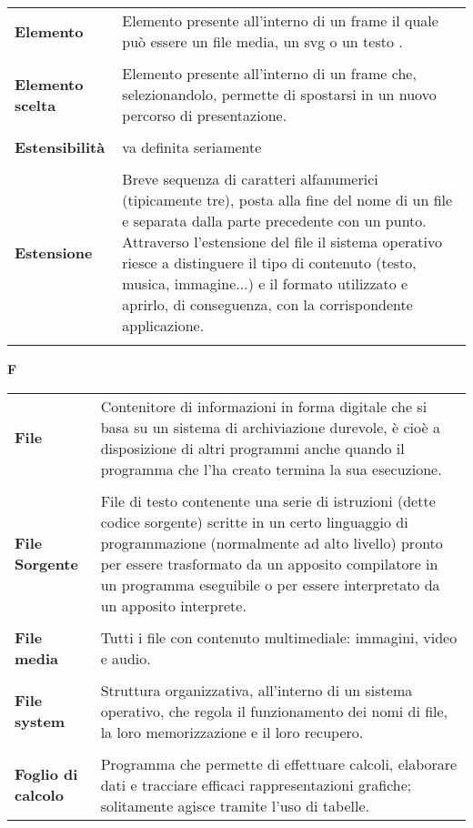 {\begin{longtable}{L{4cm} p{10cm}}
\textbf{Elemento} & Elemento presente all'interno di un frame il quale può essere un file media, un svg o un testo . \\ 
 \\ 
\textbf{Elemento scelta} & Elemento presente all'interno di un frame che, selezionandolo, permette di spostarsi in un nuovo percorso di presentazione. \\ 
 \\ 
\textbf{Estensibilità} & va definita seriamente \\ 
 \\ 
\textbf{Estensione} & Breve sequenza di caratteri alfanumerici (tipicamente tre), posta alla fine del nome di un file e separata dalla parte precedente con un punto. Attraverso l’estensione del file il sistema operativo riesce a distinguere il tipo di contenuto (testo, musica, immagine...) e il formato utilizzato e aprirlo, di conseguenza, con la corrispondente applicazione. \\ 
 \\ 
\end{longtable} 
\newpage 
{} 
{} 
\hfill\Huge{\textbf{F}} \\ 
\normalsize 
\begin{longtable}{L{4cm} p{10cm}}
\textbf{File} & Contenitore di informazioni in forma digitale che si basa su un sistema di archiviazione durevole, è cioè a disposizione di altri programmi anche quando il programma che l’ha creato termina la sua esecuzione. \\ 
 \\ 
\textbf{File Sorgente} & File di testo contenente una serie di istruzioni (dette codice sorgente) scritte in un certo linguaggio di programmazione (normalmente ad alto livello) pronto per essere trasformato da un apposito compilatore in un programma eseguibile o per essere interpretato da un apposito interprete. \\ 
 \\ 
\textbf{File media} & Tutti i file con contenuto multimediale: immagini, video e audio. \\ 
 \\ 
\textbf{File system} & Struttura organizzativa, all’interno di un sistema operativo, che regola il funzionamento dei nomi di file, la loro memorizzazione e il loro recupero. \\ 
 \\ 
\textbf{Foglio di calcolo} & Programma che permette di effettuare calcoli, elaborare dati e tracciare efficaci rappresentazioni grafiche; solitamente agisce tramite l’uso di tabelle. \\ 

\end{longtable}}
